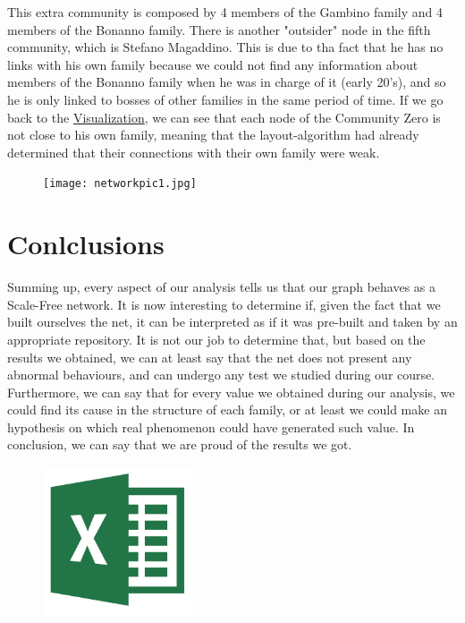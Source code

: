 \documentclass{article}
\begin{document}
\noindent
This extra community is composed by 4 members of the Gambino family and 4 members of the Bonanno family. There is another "outsider" node in the fifth community, which is Stefano Magaddino. This is due to tha fact that he has no links with his own family because we could not find any information about members of the Bonanno family when he was in charge of it (early 20's), and so he is only linked to bosses of other families in the same period of time. If we go back to the \hyperref[sec:Visualization]{Visualization}, we can see that each node of the Community Zero is not close to his own family, meaning that the layout-algorithm had already determined that their connections with their own family were weak.
\newpage



\begin{figure}[t!]
\vspace{-250pt}
\centering
\texttt{[image: networkpic1.jpg]}
\advance\leftskip-3.52cm
\end{figure}



\pagecolor{Pagine}
\section{\textcolor{Paragrafi}{Conlclusions}}
Summing up, every aspect of our analysis tells us that our graph behaves as a Scale-Free network. It is now interesting to determine if, given the fact that we built ourselves the net, it can be interpreted as if it was pre-built and taken by an appropriate repository. It is not our job to determine that, but based on the results we obtained, we can at least say that the net does not present any abnormal behaviours, and can undergo any test we studied during our course. Furthermore, we can say that for every value we obtained during our analysis, we could find its cause in the structure of each family, or at least we could make an hypothesis on which real phenomenon could have generated such value. In conclusion, we can say that we are proud of the results we got.



\begin{figure}[h!]
\vspace{50pt}
\begin{flushright}
\includegraphics[width=125pt]{excel.png}
\end{flushright}
\end{figure}
\end{document}

